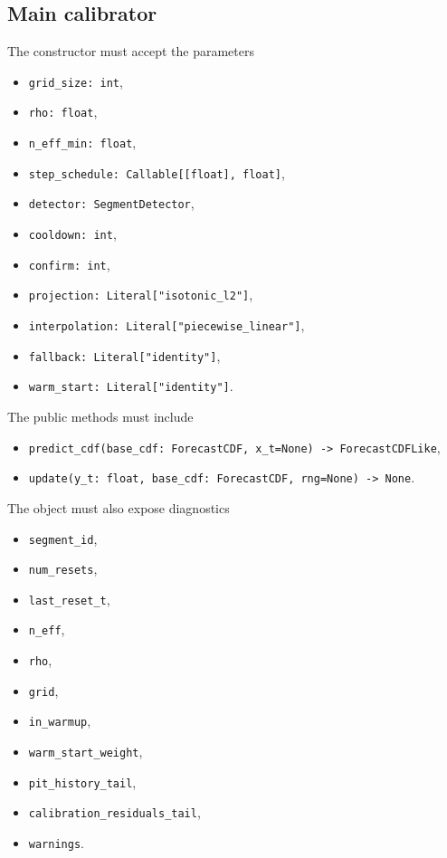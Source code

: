 \subsection{Main calibrator}

\begin{description}[leftmargin=0pt,labelindent=0pt,style=nextline]
\item[\texttt{SegmentedTransportCalibrator}]
The constructor must accept the parameters
\begin{itemize}[leftmargin=1.5em]
    \item \texttt{grid\_size: int},
    \item \texttt{rho: float},
    \item \texttt{n\_eff\_min: float},
    \item \texttt{step\_schedule: Callable[[float], float]},
    \item \texttt{detector: SegmentDetector},
    \item \texttt{cooldown: int},
    \item \texttt{confirm: int},
    \item \texttt{projection: Literal["isotonic\_l2"]},
    \item \texttt{interpolation: Literal["piecewise\_linear"]},
    \item \texttt{fallback: Literal["identity"]},
    \item \texttt{warm\_start: Literal["identity"]}.
\end{itemize}
The public methods must include
\begin{itemize}[leftmargin=1.5em]
    \item \texttt{predict\_cdf(base\_cdf: ForecastCDF, x\_t=None) -> ForecastCDFLike},
    \item \texttt{update(y\_t: float, base\_cdf: ForecastCDF, rng=None) -> None}.
\end{itemize}
The object must also expose diagnostics
\begin{itemize}[leftmargin=1.5em]
    \item \texttt{segment\_id},
    \item \texttt{num\_resets},
    \item \texttt{last\_reset\_t},
    \item \texttt{n\_eff},
    \item \texttt{rho},
    \item \texttt{grid},
    \item \texttt{in\_warmup},
    \item \texttt{warm\_start\_weight},
    \item \texttt{pit\_history\_tail},
    \item \texttt{calibration\_residuals\_tail},
    \item \texttt{warnings}.
\end{itemize}
\end{description}

